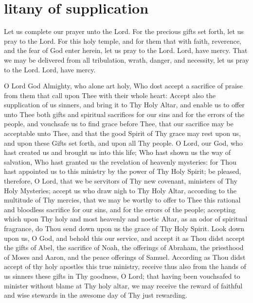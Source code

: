 \section{litany of supplication}

\begin{liturgicaltext}
    \deacon Let us complete our prayer unto the Lord.
    \choir {}
    \deacon For the precious gifts set forth, let us pray to the Lord.
    \choir {}
    \deacon For this holy temple, and for them that with faith, reverence, and the fear of God enter herein, let us pray to the Lord.
    \choir Lord, have mercy. \pagebreak
    \deacon That we may be delivered from all tribulation, wrath, danger, and necessity, let us pray to the Lord.
    \choirsemisecret Lord, have mercy. 
\end{liturgicaltext}
\begin{semisecret}
    \begin{secretprayerbasil}
        O Lord God Almighty, who alone art holy, Who dost accept a sacrifice of praise from them that call upon Thee with their whole heart: Accept also the supplication of us sinners, and bring it to Thy Holy Altar, and enable us to offer unto Thee both gifts and spiritual sacrifices for our sins and for the errors of the people, and vouchsafe us to find grace before Thee, that our sacrifice may be acceptable unto Thee, and that the good Spirit of Thy grace may rest upon us, and upon these Gifts set forth, and upon all Thy people. 
        \switchcolumn
        O Lord, our God, who hast created us and brought us into this life; Who hast shown us the way of salvation, Who hast granted us the revelation of heavenly mysteries: for Thou hast appointed us to this ministry by the power of Thy Holy Spirit; be pleased, therefore, O Lord, that we be servitors of Thy new covenant, ministers of Thy Holy Mysteries; accept us who draw nigh to Thy Holy Altar, according to the multitude of Thy mercies, that we may be worthy to offer to Thee this rational and bloodless sacrifice for our sins, and for the errors of the people; accepting which upon Thy holy and most heavenly and noetic Altar, as an odor of spiritual fragrance, do Thou send down upon us the grace of Thy Holy Spirit. Look down upon us, O God, and behold this our service, and accept it as Thou didst accept the gifts of Abel, the sacrifice of Noah, the offerings of Abraham, the priesthood of Moses and Aaron, and the peace offerings of Samuel. According as Thou didst accept of thy holy apostles this true ministry, receive thus also from the hands of us sinners these gifts in Thy goodness, O Lord; that having been vouchsafed to minister without blame at Thy holy altar, we may receive the reward of faithful and wise stewards in the awesome day of Thy just rewarding. 
    \end{secretprayerbasil}
\end{semisecret}
